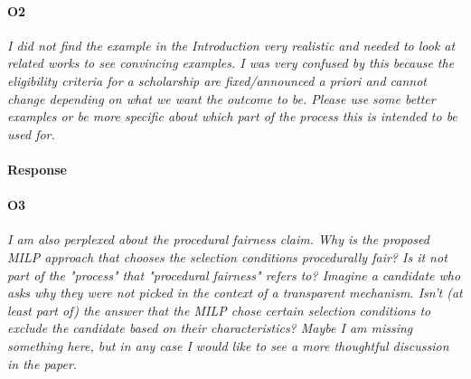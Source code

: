 \documentclass[main.tex]{subfile}
\begin{document}

\paragraph*{{\bf O2}} 
{\it I did not find the example in the Introduction very realistic and needed to look at related works to see convincing examples. I was very confused by this because the eligibility criteria for a scholarship are fixed/announced a priori and cannot change depending on what we want the outcome to be. Please use some better examples or be more specific about which part of the process this is intended to be used for.}

\paragraph*{Response}


\paragraph*{{\bf O3}} 
{\it I am also perplexed about the procedural fairness claim. Why is the proposed MILP approach that chooses the selection conditions procedurally fair? Is it not part of the "process" that "procedural fairness" refers to? Imagine a candidate who asks why they were not picked in the context of a transparent mechanism. Isn't (at least part of) the answer that the MILP chose certain selection conditions to exclude the candidate based on their characteristics? Maybe I am missing something here, but in any case I would like to see a more thoughtful discussion in the paper.}
\end{document}
